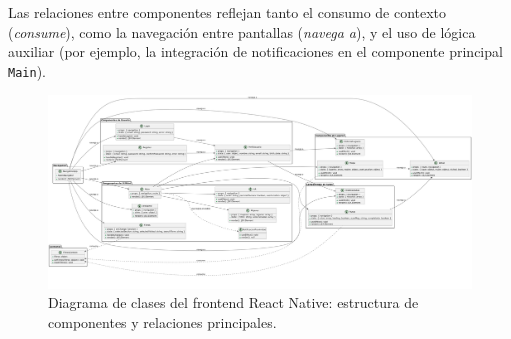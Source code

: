 Las relaciones entre componentes reflejan tanto el consumo de contexto (\textit{consume}), como la navegación entre pantallas (\textit{navega a}), y el uso de lógica auxiliar (por ejemplo, la integración de notificaciones en el componente principal \texttt{Main}).

\begin{landscape} \vfill \begin{figure}[H] \centering \includegraphics[width=1.2\paperwidth]{figs/prueba.png} \caption{Diagrama de clases del frontend React Native: estructura de componentes y relaciones principales.} \label{fig:clases-frontend} \end{figure} \vfill \end{landscape}